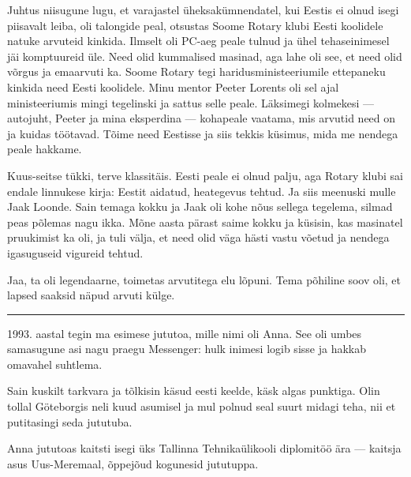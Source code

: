 Juhtus niisugune lugu, et varajastel üheksakümnendatel, kui 
Eestis ei olnud isegi piisavalt leiba, oli talongide peal, otsustas 
Soome Rotary klubi Eesti koolidele natuke arvuteid kinkida. Ilmselt oli PC-aeg peale tulnud ja ühel tehaseinimesel jäi komptuureid üle. 
Need olid kummalised masinad, aga lahe oli see, et need olid võrgus ja emaarvuti ka. Soome Rotary tegi haridusministeeriumile
ettepaneku kinkida need Eesti koolidele. 
Minu mentor Peeter Lorents oli sel ajal 
ministeeriumis mingi tegelinski ja sattus selle peale. 
Läksimegi kolmekesi --- autojuht, Peeter ja mina eksperdina --- 
kohapeale vaatama, mis arvutid need on ja kuidas töötavad. Tõime need Eestisse ja siis tekkis küsimus, mida me 
nendega peale hakkame. 


Kuus-seitse tükki, terve klassitäis. Eesti peale ei olnud palju, aga 
Rotary klubi sai endale linnukese kirja: Eestit aidatud, heategevus tehtud. Ja 
siis meenuski mulle Jaak Loonde. Sain temaga kokku ja Jaak 
oli kohe nõus sellega tegelema, silmad peas põlemas nagu ikka. Mõne aasta pärast saime kokku 
ja küsisin, kas masinatel pruukimist ka oli, ja tuli välja, et need olid väga 
hästi vastu võetud ja nendega igasuguseid vigureid tehtud. 


Jaa, ta oli legendaarne, toimetas arvutitega elu lõpuni. Tema põhiline soov oli, et lapsed saaksid näpud arvuti külge.


\bigskip
\noindent\rule{.3\textwidth}{.7pt}
\bigskip

1993. aastal tegin ma esimese 
jututoa, mille nimi oli Anna. See oli umbes samasugune asi nagu praegu Messenger: hulk inimesi logib sisse ja hakkab omavahel suhtlema. 


Sain kuskilt tarkvara ja tõlkisin käsud eesti keelde, käsk algas 
punktiga. Olin tollal Göteborgis neli kuud asumisel ja mul polnud 
seal suurt midagi teha, nii et putitasingi seda jututuba. 

Anna jututoas kaitsti isegi üks Tallinna 
Tehnikaülikooli diplomitöö ära --- kaitsja asus 
Uus-Meremaal, õppejõud kogunesid jututuppa.

